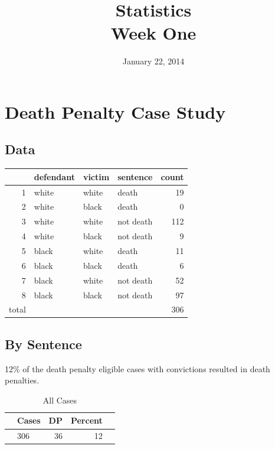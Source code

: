 \documentclass{exam}
\author{}
\date{January 22, 2014}
\title{Statistics \\ Week One}
\begin{document}
  \maketitle
  \tableofcontents

  \section{Death Penalty Case Study}
  
  \subsection{Data}
  \begin{table}[ht]
  \centering
  \begin{tabular}{rlllr}
    \toprule
          & defendant & victim & sentence  & count \\
    \midrule
    1     & white & white & death     & 19 \\
    2     & white & black & death     & 0 \\
    3     & white & white & not death & 112 \\
    4     & white & black & not death & 9 \\
    5     & black & white & death     & 11 \\
    6     & black & black & death     & 6 \\
    7     & black & white & not death & 52 \\
    8     & black & black & not death & 97 \\
    \midrule
    total &       &       &           & 306 \\
    \bottomrule
  \end{tabular}
  \end{table}

  \subsection{By Sentence}

  12\% of the death penalty eligible cases with convictions resulted in death penalties.

  \begin{table}[H]
    \centering
    \begin{tabular}{rlrrr}
      \toprule
      & Cases & DP & Percent \\
      \midrule
      & 306   & 36 & 12 \\
     \bottomrule
    \end{tabular}
    \caption{All Cases}
  \end{table}
\end{document}
